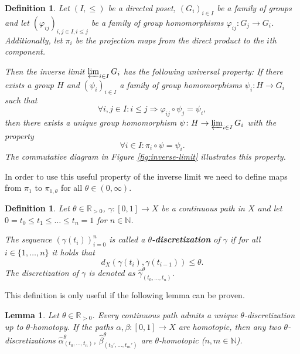 \documentclass[a4paper, 11pt, twoside]{article}
\newcommand{\R}[0]{\mathbb{R}}
\newcommand{\N}[0]{\mathbb{N}}
\theoremstyle{break}
\theoremstyle{break}
\newtheorem{defin}[thm]{Definition}
\newtheorem{lemma}[thm]{Lemma}
\begin{document}
\begin{defin}
  Let $(I, \leq)$ be a directed poset, $(G_i)_{i\in I}$ be a family of groups and let $(\varphi_{ij})_{i,j \in I, i \leq j}$ be a family of group homomorphisms $\varphi_{ij} \colon G_j \to G_i$.
  Additionally, let $\pi_i$ be the projection maps from the direct product to the $i$th component.
  
  Then the inverse limit $\varprojlim_{i\in I} G_i$ has the following universal property:
  If there exists a group $H$ and $(\psi_i)_{i\in I}$ a family of group homomorphisms $\psi_i\colon H \to G_i$ such that 
  \begin{equation*}
    \forall i,j \in I\colon i \leq j \Rightarrow \varphi_{ij} \circ \psi_j = \psi_i,
  \end{equation*}
  then there exists a unique group homomorphism $\psi\colon H \to \varprojlim_{i\in I} G_i$ with the property
  \begin{equation*}
    \forall i \in I\colon \pi_i \circ \psi = \psi_i.
  \end{equation*}
  The commutative diagram in Figure \ref{fig:inverse-limit} illustrates this property.
\end{defin}

In order to use this useful property of the inverse limit we need to define maps from $\pi_1$ to $\pi_{1,\theta}$ for all $\theta \in (0,\infty)$. 
\begin{defin}
  Let $\theta \in \R_{>0}$, $\gamma\colon [0,1] \to X$ be a continuous path in $X$ and let $0 = t_0 \leq t_1 \leq \ldots \leq t_n = 1$ for $n \in \N$.

  The sequence $(\gamma(t_i))_{i=0}^n$ is called a \textbf{$\theta$-discretization} of $\gamma$ if for all $i \in \{1, \ldots, n\}$ it holds that
  \begin{equation*}
    d_X(\gamma(t_{i}), \gamma(t_{i-1})) \leq \theta.
  \end{equation*}
  The discretization of $\gamma$ is denoted as $\widehat{\gamma}^{\theta}_{(t_0, \ldots, t_n)}$.
\end{defin}

This definition is only useful if the following lemma can be proven.

\begin{lemma}\label{lem:discretization}
  Let $\theta \in \R_{>0}$. Every continuous path admits a unique $\theta$-discretization up to $\theta$-homotopy. If the paths $\alpha, \beta\colon [0,1] \to X$ are homotopic, then any two $\theta$-discretizations 
  $\widehat{\alpha}^{\theta}_{(t_0, \ldots, t_n)}$, $\widehat{\beta}^{\theta}_{(t_0', \ldots, t_m')}$ are $\theta$-homotopic ($n,m \in \N$).
\end{lemma}
\end{document}
